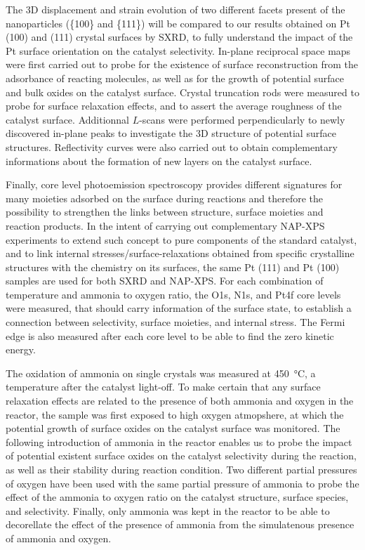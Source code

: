 The 3D displacement and strain evolution of two different facets present of the nanoparticles (\{100\} and \{111\}) will be compared to our results obtained on Pt (100) and (111) crystal surfaces by SXRD, to fully understand the impact of the Pt surface orientation on the catalyst selectivity.
In-plane reciprocal space maps were first carried out to probe for the existence of surface reconstruction from the adsorbance of reacting molecules, as well as for the growth of potential surface and bulk oxides on the catalyst surface.
Crystal truncation rods were measured to probe for surface relaxation effects, and to assert the average roughness of the catalyst surface.
Additionnal $L$-scans were performed perpendicularly to newly discovered in-plane peaks to investigate the 3D structure of potential surface structures.
Reflectivity curves were also carried out to obtain complementary informations about the formation of new layers on the catalyst surface.

Finally, core level photoemission spectroscopy provides different signatures for many moieties adsorbed on the surface during reactions and therefore the possibility to strengthen the links between structure, surface moieties and reaction products.
In the intent of carrying out complementary NAP-XPS experiments to extend such concept to pure components of the standard catalyst, and to link internal stresses/surface-relaxations obtained from specific crystalline structures with the chemistry on its surfaces, the same Pt (111) and Pt (100) samples are used for both SXRD and NAP-XPS.
For each combination of temperature and ammonia to oxygen ratio, the O1s, N1s, and Pt4f core levels were measured, that should carry information of the surface state, to establish a connection between selectivity, surface moieties, and internal stress.
The Fermi edge is also measured after each core level to be able to find the zero kinetic energy.

The oxidation of ammonia on single crystals was measured at \qty{450}{\degreeCelsius}, a temperature after the catalyst light-off.
To make certain that any surface relaxation effects are related to the presence of both ammonia and oxygen in the reactor, the sample was first exposed to high oxygen atmopshere, at which the potential growth of surface oxides on the catalyst surface was monitored.
The following introduction of ammonia in the reactor enables us to probe the impact of potential existent surface oxides on the catalyst selectivity during the reaction, as well as their stability during reaction condition.
Two different partial pressures of oxygen have been used with the same partial pressure of ammonia to probe the effect of the ammonia to oxygen ratio on the catalyst structure, surface species, and selectivity.
Finally, only ammonia was kept in the reactor to be able to decorellate the effect of the presence of ammonia from the simulatenous presence of ammonia and oxygen.

